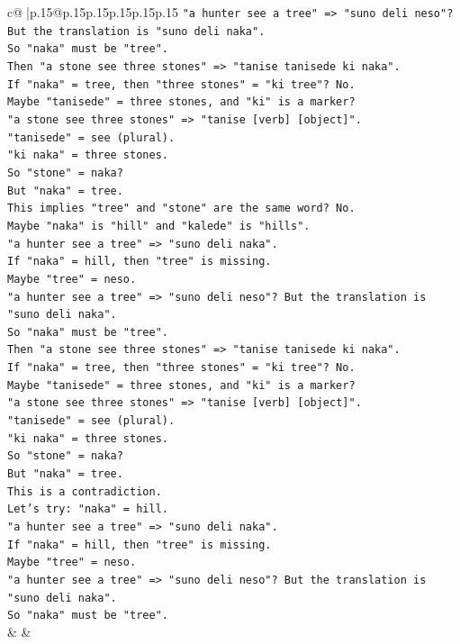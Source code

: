 \documentclass{article}
\begin{document}
{\begin{supertabular}{c@{$\;$}|p{.15\linewidth}@{}p{.15\linewidth}p{.15\linewidth}p{.15\linewidth}p{.15\linewidth}p{.15\linewidth}}
{{{\texttt{"a hunter see a tree" => "suno deli neso"? But the translation is "suno deli naka".} \\
\texttt{So "naka" must be "tree".} \\
\texttt{Then "a stone see three stones" => "tanise tanisede ki naka".} \\
\texttt{If "naka" = tree, then "three stones" = "ki tree"? No.} \\
\texttt{Maybe "tanisede" = three stones, and "ki" is a marker?} \\
\texttt{"a stone see three stones" => "tanise {[}verb{]} {[}object{]}".} \\
\texttt{"tanisede" = see (plural).} \\
\texttt{"ki naka" = three stones.} \\
\texttt{So "stone" = naka?} \\
\texttt{But "naka" = tree.} \\
\texttt{This implies "tree" and "stone" are the same word? No.} \\
\texttt{Maybe "naka" is "hill" and "kalede" is "hills".} \\
\texttt{"a hunter see a tree" => "suno deli naka".} \\
\texttt{If "naka" = hill, then "tree" is missing.} \\
\texttt{Maybe "tree" = neso.} \\
\texttt{"a hunter see a tree" => "suno deli neso"? But the translation is "suno deli naka".} \\
\texttt{So "naka" must be "tree".} \\
\texttt{Then "a stone see three stones" => "tanise tanisede ki naka".} \\
\texttt{If "naka" = tree, then "three stones" = "ki tree"? No.} \\
\texttt{Maybe "tanisede" = three stones, and "ki" is a marker?} \\
\texttt{"a stone see three stones" => "tanise {[}verb{]} {[}object{]}".} \\
\texttt{"tanisede" = see (plural).} \\
\texttt{"ki naka" = three stones.} \\
\texttt{So "stone" = naka?} \\
\texttt{But "naka" = tree.} \\
\texttt{This is a contradiction.} \\
\texttt{Let's try: "naka" = hill.} \\
\texttt{"a hunter see a tree" => "suno deli naka".} \\
\texttt{If "naka" = hill, then "tree" is missing.} \\
\texttt{Maybe "tree" = neso.} \\
\texttt{"a hunter see a tree" => "suno deli neso"? But the translation is "suno deli naka".} \\
\texttt{So "naka" must be "tree".} \\
            }
        }
    }
    & & \\ \\


\end{supertabular}}
\end{document}
